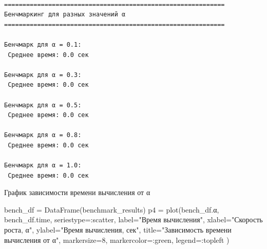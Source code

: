 \documentclass[
  english,
  russian,
  12pt,
  a4paper,
  DIV=11,
  numbers=noendperiod]{scrreprt}
\newenvironment{Shaded}{\begin{snugshade}}{\end{snugshade}}
\newcommand{\CommentTok}[1]{\textcolor[rgb]{0.37,0.37,0.37}{#1}}
\newcommand{\ControlFlowTok}[1]{\textcolor[rgb]{0.00,0.23,0.31}{\textbf{#1}}}
\newcommand{\FloatTok}[1]{\textcolor[rgb]{0.68,0.00,0.00}{#1}}
\newcommand{\FunctionTok}[1]{\textcolor[rgb]{0.28,0.35,0.67}{#1}}
\newcommand{\KeywordTok}[1]{\textcolor[rgb]{0.00,0.23,0.31}{\textbf{#1}}}
\newcommand{\NormalTok}[1]{\textcolor[rgb]{0.00,0.23,0.31}{#1}}
\newcommand{\OperatorTok}[1]{\textcolor[rgb]{0.37,0.37,0.37}{#1}}
\newcommand{\PreprocessorTok}[1]{\textcolor[rgb]{0.68,0.00,0.00}{#1}}
\newcommand{\SpecialCharTok}[1]{\textcolor[rgb]{0.37,0.37,0.37}{#1}}
\newcommand{\StringTok}[1]{\textcolor[rgb]{0.13,0.47,0.30}{#1}}
\begin{document}
\begin{Shaded}
\end{Shaded}

\begin{verbatim}

============================================================
Бенчмаркинг для разных значений α
============================================================

Бенчмарк для α = 0.1:
 Среднее время: 0.0 сек

Бенчмарк для α = 0.3:
 Среднее время: 0.0 сек

Бенчмарк для α = 0.5:
 Среднее время: 0.0 сек

Бенчмарк для α = 0.8:
 Среднее время: 0.0 сек

Бенчмарк для α = 1.0:
 Среднее время: 0.0 сек
\end{verbatim}

График зависимости времени вычисления от α

\begin{Shaded}
\begin{Highlighting}[]
\NormalTok{bench\_df }\OperatorTok{=} \FunctionTok{DataFrame}\NormalTok{(benchmark\_results)}
\NormalTok{p4 }\OperatorTok{=} \FunctionTok{plot}\NormalTok{(bench\_df.α, bench\_df.time,}
\NormalTok{seriestype}\OperatorTok{=:}\NormalTok{scatter,}
\NormalTok{label}\OperatorTok{=}\StringTok{"Время вычисления"}\NormalTok{,}
\NormalTok{xlabel}\OperatorTok{=}\StringTok{"Скорость роста, α"}\NormalTok{,}
\NormalTok{ylabel}\OperatorTok{=}\StringTok{"Время вычисления, сек"}\NormalTok{,}
\NormalTok{title}\OperatorTok{=}\StringTok{"Зависимость времени вычисления от α"}\NormalTok{, markersize}\OperatorTok{=}\FloatTok{8}\NormalTok{,}
\NormalTok{markercolor}\OperatorTok{=:}\NormalTok{green,}
\NormalTok{legend}\OperatorTok{=:}\NormalTok{topleft}
\NormalTok{)}
\end{Highlighting}
\end{Shaded}
\end{document}
